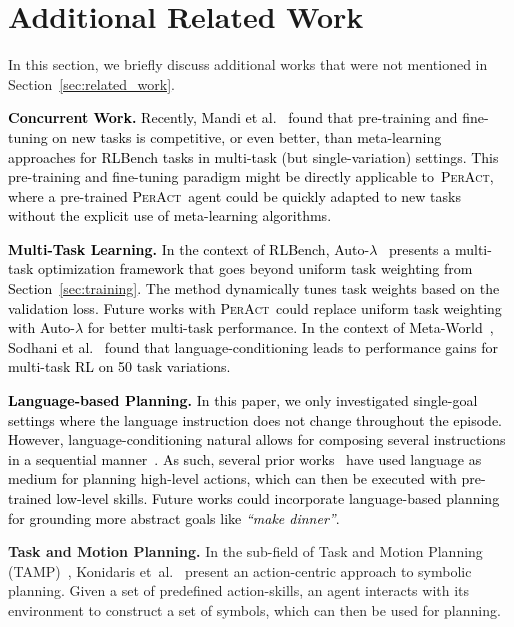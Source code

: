 \documentclass{article}
\newcommand{\secref}[1]{Section~\ref{#1}}
\newcommand{\etal}{\textrm{et~al.}}
\newcommand{\highlight}[1]{\textcolor{black}{#1}}
\newcommand{\model}{\textsc{PerAct}}
\begin{document}
\section{Additional Related Work}

In this section, we briefly discuss additional works that were not mentioned in \secref{sec:related_work}.

\highlight{\textbf{Concurrent Work.} Recently, Mandi et al.~\citep{mandi2022effectiveness} found that pre-training and fine-tuning on new tasks is competitive, or even better, than meta-learning approaches for RLBench tasks in multi-task (but single-variation) settings. This pre-training and fine-tuning paradigm might be directly applicable to~\model, where a pre-trained \model ~agent could be quickly adapted to new tasks without the explicit use of meta-learning algorithms.}

\highlight{\textbf{Multi-Task Learning.} In the context of RLBench, Auto-$\lambda$~\citep{liu2022auto_lambda} presents a multi-task optimization framework that goes beyond uniform task weighting from \secref{sec:training}. The method dynamically tunes task weights based on the validation loss. Future works with \model~could replace uniform task weighting with Auto-$\lambda$ for better multi-task performance. In the context of Meta-World~\citep{yu2020meta}, Sodhani et al.~\citep{pmlr-v139-sodhani21a} found that language-conditioning leads to performance gains for multi-task RL on 50 task variations.}

\highlight{\textbf{Language-based Planning.} In this paper, we only investigated single-goal settings where the language instruction does not change throughout the episode. However, language-conditioning natural allows for composing several instructions in a sequential manner~\citep{lynch2020grounding}. As such, several prior  works~\citep{ALFWorld20,ahn2022can,zeng2022socratic,huang2022language} have used language as medium for planning high-level actions, which can then be executed with pre-trained low-level skills. Future works could incorporate language-based planning for grounding more abstract goals like \textit{``make dinner''}.}

\textbf{Task and Motion Planning.} In the sub-field of Task and Motion Planning (TAMP)~\citep{kaelbling2013integrated,garrett2021integrated}, Konidaris \etal~\citep{konidaris2018skills} present an action-centric approach to symbolic planning. Given a set of predefined action-skills, an agent interacts with its environment to construct a set of symbols, which can then be used for planning.
\end{document}
